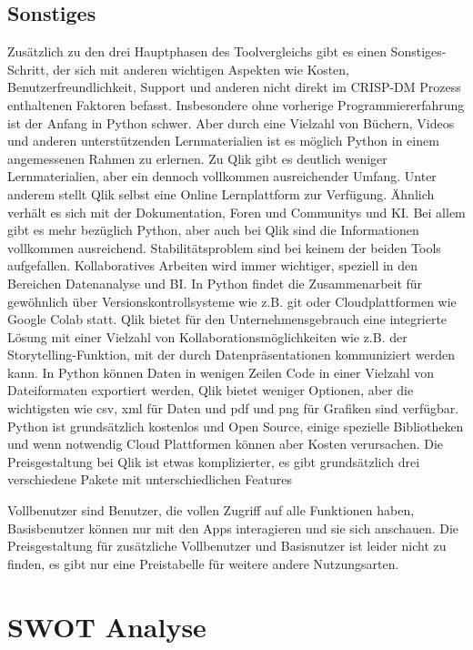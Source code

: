 \documentclass[12pt]{article}
\begin{document}
	\subsection{Sonstiges}
	Zusätzlich zu den drei Hauptphasen des Toolvergleichs gibt es einen Sonstiges-Schritt, der sich mit anderen wichtigen Aspekten wie Kosten, Benutzerfreundlichkeit, Support und anderen nicht direkt im CRISP-DM Prozess enthaltenen Faktoren befasst.
	Insbesondere ohne vorherige Programmiererfahrung ist der Anfang in Python schwer. Aber durch eine Vielzahl von Büchern, Videos und anderen unterstützenden Lernmaterialien ist es möglich Python in einem angemessenen Rahmen zu erlernen. Zu Qlik gibt es deutlich weniger Lernmaterialien, aber ein dennoch vollkommen ausreichender Umfang. Unter anderem stellt Qlik selbst eine Online Lernplattform zur Verfügung. Ähnlich verhält es sich mit der Dokumentation, Foren und Communitys und KI. Bei allem gibt es mehr bezüglich Python, aber auch bei Qlik sind die Informationen vollkommen ausreichend. Stabilitätsproblem sind bei keinem der beiden Tools aufgefallen. Kollaboratives Arbeiten wird immer wichtiger, speziell in den Bereichen Datenanalyse und BI. In Python findet die Zusammenarbeit für gewöhnlich über Versionskontrollsysteme wie z.B. git oder Cloudplattformen wie Google Colab statt. Qlik bietet für den Unternehmensgebrauch eine integrierte Lösung mit einer Vielzahl von Kollaborationsmöglichkeiten wie z.B. der Storytelling-Funktion, mit der durch Datenpräsentationen kommuniziert werden kann.
	In Python können Daten in wenigen Zeilen Code in einer Vielzahl von Dateiformaten exportiert werden, Qlik bietet weniger Optionen, aber die wichtigsten wie csv, xml für Daten und pdf und png für Grafiken sind verfügbar. Python ist grundsätzlich kostenlos und Open Source, einige spezielle Bibliotheken und wenn notwendig Cloud Plattformen können aber Kosten verursachen. Die Preisgestaltung bei Qlik ist etwas komplizierter, es gibt grundsätzlich drei verschiedene Pakete mit unterschiedlichen Features %
	
	 Vollbenutzer sind Benutzer, die vollen Zugriff auf alle Funktionen haben, Basisbenutzer können nur mit den Apps interagieren und sie sich anschauen.
	Die Preisgestaltung für zusätzliche Vollbenutzer und Basisnutzer ist leider nicht zu finden, es gibt nur eine Preistabelle für weitere andere Nutzungsarten.
	\section{SWOT Analyse}
	
\end{document}

